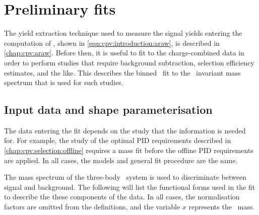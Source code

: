\chapter{Preliminary fits}
\label{chap:cpv:prelim_fits}

The yield extraction technique used to measure the signal yields entering the 
computation of \ARaw, shown in \cref{eqn:cpv:introduction:araw}, is described 
in \cref{chap:cpv:araw}.
Before then, it is useful to fit to the charge-combined data in order to 
perform studies that require background subtraction, selection efficiency 
estimates, and the like.
This  describes the binned \chisq\ fit to the 
\phh\ invariant mass spectrum that is used for such studies.

\section{Input data and shape parameterisation}
\label{chap:cpv:prelim_fits:data_pdfs}

The data entering the fit depends on the study that the information is needed 
for.
For example, the study of the optimal \ac{PID} requirements described in 
\cref{chap:cpv:selection:offline} requires a mass fit before the offline 
\ac{PID} requirements are applied.
In all cases, the models and general fit procedure are the same.

The mass spectrum of the three-body \phh\ system is used to discriminate 
between signal and background.
The following will list the functional forms used in the fit to describe the 
these components of the data.
In all cases, the normalisation factors are omitted from the definitions, and 
the variable $x$ represents the \PLambdac\ mass.

